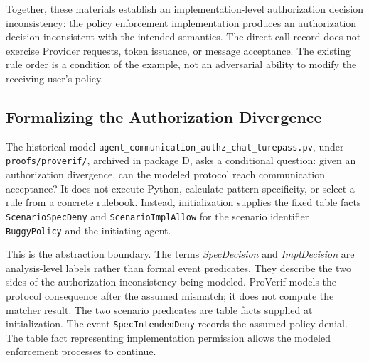 Together, these materials establish an implementation-level authorization
decision inconsistency: the policy enforcement implementation produces an authorization
decision inconsistent with the intended semantics. The direct-call record
does not exercise Provider requests, token issuance, or message acceptance.
The existing rule order is a condition of the example, not an adversarial
ability to modify the receiving user's policy.


\subsection{Formalizing the Authorization Divergence}

The historical model
\texttt{agent\_communication\_\allowbreak authz\_chat\_\allowbreak turepass.pv}, under
\texttt{proofs/proverif/}, archived in package D, asks a conditional question: given an authorization
divergence, can the modeled protocol reach communication acceptance?
It does not execute Python, calculate pattern specificity, or select a rule
from a concrete rulebook. Instead, initialization supplies the fixed table
facts \texttt{ScenarioSpecDeny} and \texttt{ScenarioImplAllow} for the scenario
identifier \texttt{BuggyPolicy} and the initiating agent.

This is the abstraction boundary. The terms \emph{SpecDecision} and
\emph{ImplDecision} are analysis-level labels rather than formal event
predicates. They describe the two sides of the authorization inconsistency
being modeled. ProVerif models the protocol consequence after the assumed
mismatch; it does not compute the matcher result. The two scenario predicates
are table facts supplied at initialization. The
event \texttt{SpecIntendedDeny} records the assumed policy denial. The table
fact representing implementation permission allows the modeled enforcement
processes to continue.

